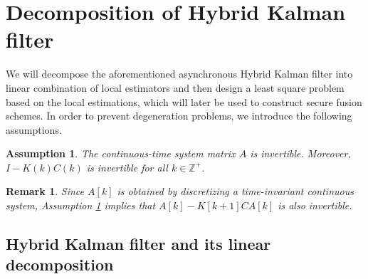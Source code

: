 \documentclass[12pt]{article}
\newcommand{\Zb}{{\mathbb{Z}}}
\newtheorem{remark}{\textbf{Remark}}
\newtheorem{assumption}{\textbf{Assumption}}
\begin{document}
\section{Decomposition of Hybrid Kalman filter}
We will decompose the aforementioned asynchronous Hybrid Kalman filter into linear combination of local estimators and then design a least square problem based on the local estimations, which will later be used to construct secure fusion schemes.
In order to prevent degeneration problems, we introduce the following assumptions.
\begin{assumption}\label{as:A_inv}
	The continuous-time system matrix $A$ is invertible. Moreover, $I-K(k)C(k)$ is invertible for all $k\in\Zb^+$.
\end{assumption}
\begin{remark}
	Since $A[k]$ is obtained by discretizing a time-invariant continuous system, Assumption \ref{as:A_inv} implies that $A[k]-K[k+1]CA[k]$ is also invertible. 
\end{remark}
\subsection{Hybrid Kalman filter and its linear decomposition}
\end{document}
